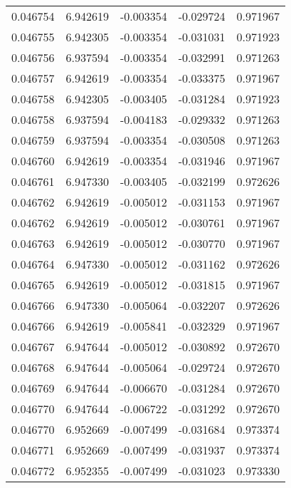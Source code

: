 \begin{tabular}{lrrrr}
0.046754    &  6.942619 & -0.003354 & -0.029724 &             0.971967 \\
0.046755    &  6.942305 & -0.003354 & -0.031031 &             0.971923 \\
0.046756    &  6.937594 & -0.003354 & -0.032991 &             0.971263 \\
0.046757    &  6.942619 & -0.003354 & -0.033375 &             0.971967 \\
0.046758    &  6.942305 & -0.003405 & -0.031284 &             0.971923 \\
0.046758    &  6.937594 & -0.004183 & -0.029332 &             0.971263 \\
0.046759    &  6.937594 & -0.003354 & -0.030508 &             0.971263 \\
0.046760    &  6.942619 & -0.003354 & -0.031946 &             0.971967 \\
0.046761    &  6.947330 & -0.003405 & -0.032199 &             0.972626 \\
0.046762    &  6.942619 & -0.005012 & -0.031153 &             0.971967 \\
0.046762    &  6.942619 & -0.005012 & -0.030761 &             0.971967 \\
0.046763    &  6.942619 & -0.005012 & -0.030770 &             0.971967 \\
0.046764    &  6.947330 & -0.005012 & -0.031162 &             0.972626 \\
0.046765    &  6.942619 & -0.005012 & -0.031815 &             0.971967 \\
0.046766    &  6.947330 & -0.005064 & -0.032207 &             0.972626 \\
0.046766    &  6.942619 & -0.005841 & -0.032329 &             0.971967 \\
0.046767    &  6.947644 & -0.005012 & -0.030892 &             0.972670 \\
0.046768    &  6.947644 & -0.005064 & -0.029724 &             0.972670 \\
0.046769    &  6.947644 & -0.006670 & -0.031284 &             0.972670 \\
0.046770    &  6.947644 & -0.006722 & -0.031292 &             0.972670 \\
0.046770    &  6.952669 & -0.007499 & -0.031684 &             0.973374 \\
0.046771    &  6.952669 & -0.007499 & -0.031937 &             0.973374 \\
0.046772    &  6.952355 & -0.007499 & -0.031023 &             0.973330 \\

\end{tabular}
